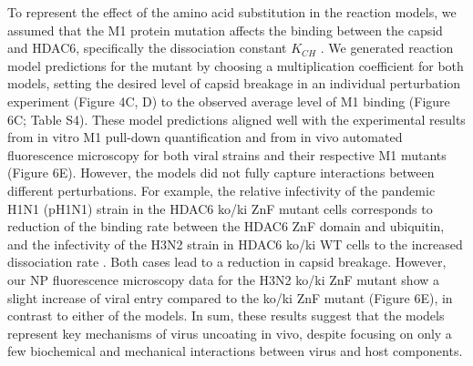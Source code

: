 To represent the effect of the amino acid substitution in the reaction models, we assumed that the M1 protein mutation affects the binding between the capsid and HDAC6, specifically the dissociation constant $K_{CH}$ . We generated reaction model predictions for the mutant by choosing a multiplication coefficient for both models, setting the desired level of capsid breakage in an individual perturbation experiment (Figure 4C, D) to the observed average level of M1 binding (Figure 6C; Table S4). These model predictions aligned well with the experimental results from in vitro M1 pull-down quantification and from in vivo automated fluorescence microscopy for both viral strains and their respective M1 mutants (Figure 6E). However, the models did not fully capture interactions between different perturbations. For example, the relative infectivity of the pandemic H1N1 (pH1N1) strain in the HDAC6 ko/ki ZnF mutant cells corresponds to reduction of the binding rate  between the HDAC6 ZnF domain and ubiquitin, and the infectivity of the H3N2 strain in HDAC6 ko/ki WT cells to the increased dissociation rate  . Both cases lead to a reduction in capsid breakage. However, our NP fluorescence microscopy data for the H3N2 ko/ki ZnF mutant show a slight increase of viral entry compared to the ko/ki ZnF mutant (Figure 6E), in contrast to either of the models. In sum, these results suggest that the models represent key mechanisms of virus uncoating in vivo, despite focusing on only a few biochemical and mechanical interactions between virus and host components.
